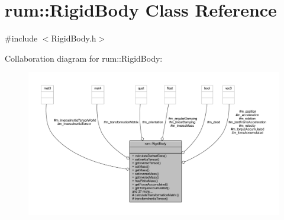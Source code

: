 \hypertarget{classrum_1_1_rigid_body}{}\section{rum\+:\+:Rigid\+Body Class Reference}
\label{classrum_1_1_rigid_body}


{\ttfamily \#include $<$Rigid\+Body.\+h$>$}



Collaboration diagram for rum\+:\+:Rigid\+Body\+:\nopagebreak
\begin{figure}[H]
\begin{center}
\leavevmode
\includegraphics[width=350pt]{classrum_1_1_rigid_body__coll__graph}
\end{center}
\end{figure}
